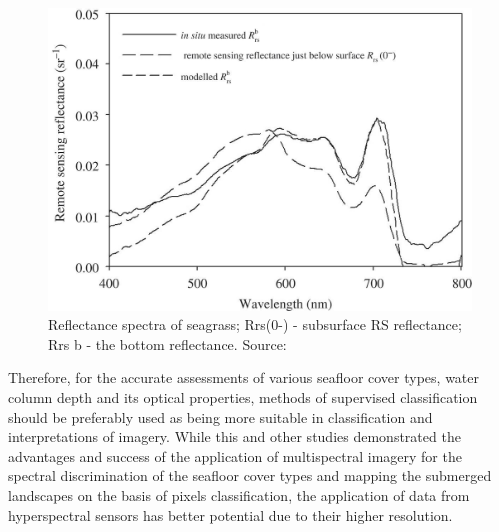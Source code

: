 \documentclass[10pt, a4paper]{article}
\begin{document}
\begin{figure}
\centering
\includegraphics[scale=0.15]{Fig-15.jpg}
\caption{Reflectance spectra of seagrass; Rrs(0-)
- subsurface RS reflectance; Rrs b - the bottom
reflectance. Source:\cite{Yang10}\label{Yang10}}
\label{fig:15}
\end{figure}

Therefore, for the accurate assessments of various seafloor cover types, water
column depth and its optical properties, methods of supervised classification should be preferably
used as being more suitable in classification and interpretations of imagery.
While this and other studies \cite{Phinn08}\label{Phinn08}demonstrated the advantages and success of the
application of multispectral imagery for the spectral discrimination of the seafloor cover types and
mapping the submerged landscapes on the basis of pixels classification, the application of data from
hyperspectral sensors has better potential due to their higher resolution.
\end{document}
